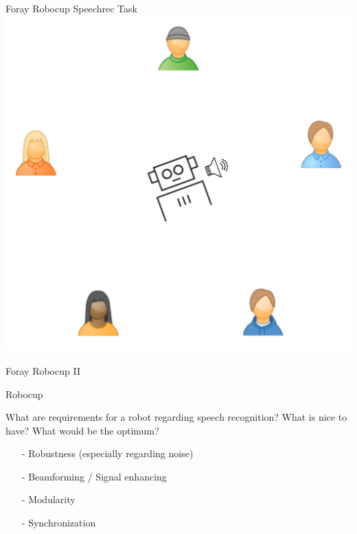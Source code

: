 \documentclass{beamer}
\begin{document}
	\begin{frame}{Foray Robocup Speechrec Task}
		\centering
		\includegraphics[width=.75\textwidth]{Bilder/robocup_task_2}
	\end{frame}
	
	\begin{frame}{Foray Robocup II}
		\centering
	\end{frame}
	
	\begin{frame}{Robocup}
		
		\begin{alertblock}{What are requirements for a robot regarding speech recognition? What is nice to have? What would be the optimum?}
			\pause
			\begin{itemize}
				\item[-] Robustness (especially regarding noise)
				\item[-] Beamforming / Signal enhancing
				\item[-] Modularity
				\item[-] Synchronization
			\end{itemize}
		\end{alertblock}
		
	\end{frame}
	
\end{document}
